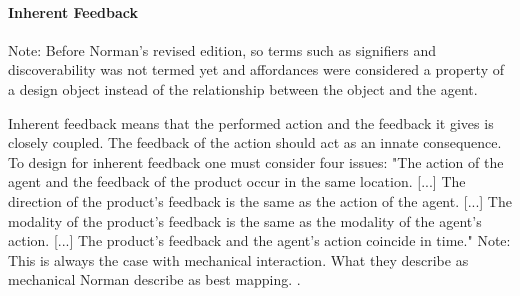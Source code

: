 \paragraph{Inherent Feedback} Note: Before Norman's revised edition, so terms such as signifiers and discoverability was not termed yet and affordances were considered a property of a design object instead of the relationship between the object and the agent.

Inherent feedback means that the performed action and the feedback it gives is closely coupled. The feedback of the action should act as an innate consequence. To design for inherent feedback one must consider four issues: "The action of the agent and the feedback of the product occur in the
same location. [...] The direction of the product's feedback is the same as the action of
the agent. [...] The modality of the product's feedback is the same as the modality
of the agent's action. [...] The product's feedback and the agent's action coincide in time."
Note: This is always the case with mechanical interaction. What they describe as mechanical Norman describe as best mapping.
\cite{howdonald}.

\cite{frogger}




\newpage
